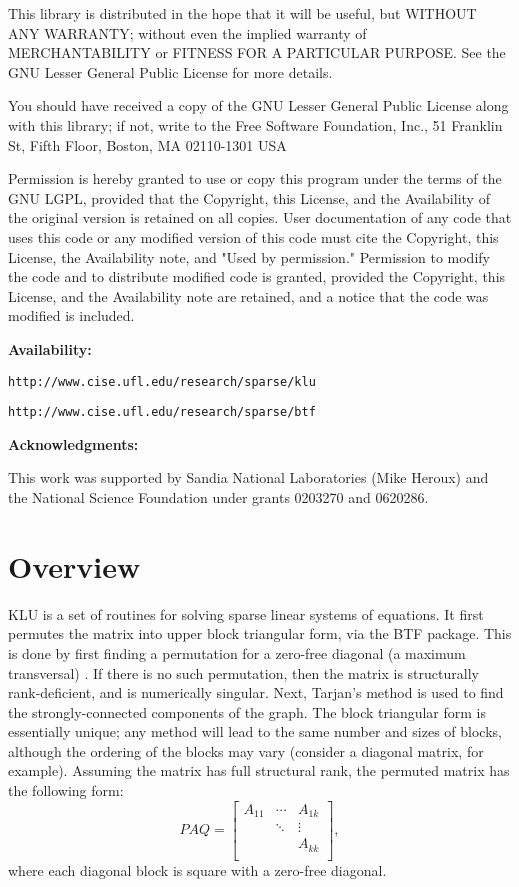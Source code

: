 \documentclass[11pt]{article}
\begin{document}
    This library is distributed in the hope that it will be useful,
    but WITHOUT ANY WARRANTY; without even the implied warranty of
    MERCHANTABILITY or FITNESS FOR A PARTICULAR PURPOSE.  See the GNU
    Lesser General Public License for more details.

    You should have received a copy of the GNU Lesser General Public
    License along with this library; if not, write to the Free Software
    Foundation, Inc., 51 Franklin St, Fifth Floor, Boston, MA  02110-1301
    USA

    Permission is hereby granted to use or copy this program under the
    terms of the GNU LGPL, provided that the Copyright, this License,
    and the Availability of the original version is retained on all copies.
    User documentation of any code that uses this code or any modified
    version of this code must cite the Copyright, this License, the
    Availability note, and "Used by permission." Permission to modify
    the code and to distribute modified code is granted, provided the
    Copyright, this License, and the Availability note are retained,
    and a notice that the code was modified is included.

{\bf Availability:}

    {\tt http://www.cise.ufl.edu/research/sparse/klu}

    {\tt http://www.cise.ufl.edu/research/sparse/btf}

{\bf Acknowledgments:}

    This work was supported by Sandia National Laboratories (Mike Heroux)
    and the National Science Foundation under grants 0203270 and 0620286.


\newpage
\section{Overview}

KLU is a set of routines for solving sparse linear systems of equations.  It
first permutes the matrix into upper block triangular form, via the BTF
package.  This is done by first finding a permutation for a zero-free diagonal
(a maximum transversal) \cite{Duff81}. If there is no such permutation, then
the matrix is structurally rank-deficient, and is numerically singular.  Next,
Tarjan's method \cite{Duff78a,Tarjan72} is used to find the strongly-connected
components of the graph.  The block triangular form is essentially unique; any
method will lead to the same number and sizes of blocks, although the ordering
of the blocks may vary (consider a diagonal matrix, for example).  Assuming the
matrix has full structural rank, the permuted matrix has the following form:
\[
PAQ =
\left[
\begin{array}{ccc}
A_{11} & \cdots & A_{1k} \\
       & \ddots & \vdots \\
       &        & A_{kk} \\
\end{array}
\right],
\]
where each diagonal block is square with a zero-free diagonal.
\end{document}
